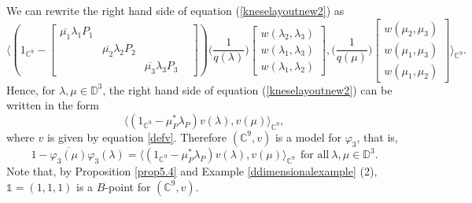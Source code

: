 \documentclass[11pt, reqno]{amsart}
\newcommand\1{\boldsymbol {1}}
\numberwithin{equation}{section}
\begin{document}
 We can rewrite the right hand side of equation (\ref{kneselayoutnew2}) as 
$$    \Bigg\langle \left(1_{\mathbb{C}^{9}}-\begin{bmatrix}
    \overline{\mu_{1}}\lambda_{1}P_{1} & & & \\
    &\overline{\mu_{2}}\lambda_{2}P_{2} & & \\
    & &\overline{\mu_{3}}\lambda_{3}P_{3}
\end{bmatrix} \right) \bigg(\dfrac{1}{q(\lambda)}\bigg)\begin{bmatrix}
    w(\lambda_{2},\lambda_{3})\\
    w(\lambda_{1},\lambda_{3})\\
    w(\lambda_{1},\lambda_{2})
\end{bmatrix},\bigg(\dfrac{1}{q(\mu)}\bigg)\begin{bmatrix}
    w(\mu_{2},\mu_{3})\\
    w(\mu_{1},\mu_{3})\\
    w(\mu_{1},\mu_{2})
\end{bmatrix}\Bigg\rangle_{\mathbb{C}^{9}}.$$
Hence, for $\lambda,\mu\in\mathbb{D}^{3}$, the right hand side of equation (\ref{kneselayoutnew2}) can be written in the form
$$   \langle (1_{\mathbb{C}^{9}}-\mu^{*}_{P}\lambda_{P})v(\lambda),v(\mu)\rangle_{\mathbb{C}^{9}},$$
where $v$ is given by equation \eqref{defv}.
Therefore $(\mathbb{C}^{9},v)$ is a model for $\varphi_3$, that is,
$$1-\overline{\varphi_3(\mu)}\varphi_3(\lambda) = \langle (1_{\mathbb{C}^{9}}-\mu^{*}_{P}\lambda_{P})v(\lambda),v(\mu)\rangle_{\mathbb{C}^{9}}~~\text{for all}~\lambda,\mu\in\mathbb{D}^{3}.$$
Note that, by Proposition \ref{prop5.4} and Example \ref{ddimensionalexample} (2), $\mathds{1}=(1,1,1)$ is a $B$-point for $(\mathbb{C}^{9},v)$.
\end{document}
